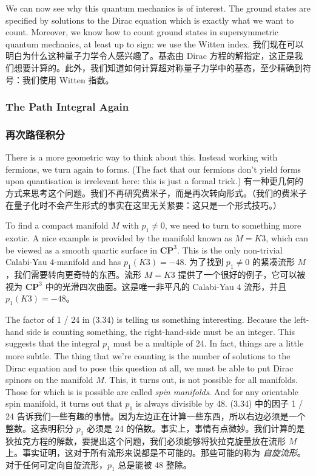 \documentclass{ctexart}
\begin{document}
\begin{paracol}{2}
We can now see why this quantum mechanics is of interest. The ground states are specified by solutions to the Dirac equation which is exactly what we want to count. Moreover, we know how to count ground states in supersymmetric quantum mechanics, at least up to sign: we use the Witten index.
\switchcolumn
我们现在可以明白为什么这种量子力学令人感兴趣了。基态由 Dirac 方程的解指定，这正是我们想要计算的。此外，我们知道如何计算超对称量子力学中的基态，至少精确到符号：我们使用 Witten 指数。
\switchcolumn*

\subsubsection{The Path Integral Again}
\switchcolumn
\subsubsection*{再次路径积分}
\switchcolumn*

There is a more geometric way to think about this. Instead working with fermions, we turn again to forms. (The fact that our fermions don't yield forms upon quantisation is irrelevant here: this is just a formal trick.)
\switchcolumn
有一种更几何的方式来思考这个问题。我们不再研究费米子，而是再次转向形式。（我们的费米子在量子化时不会产生形式的事实在这里无关紧要：这只是一个形式技巧。）
\switchcolumn*

To find a compact manifold $M$ with $p_1 \neq 0$, we need to turn to something more exotic. A nice example is provided by the manifold known as $M = K3$, which can be viewed as a smooth quartic surface in $\mathbf{CP}^3$. This is the only non-trivial Calabi-Yau $4$-manifold and has $p_1(K3) = - 48$.
\switchcolumn
为了找到 $p_1 \neq 0$ 的紧凑流形 $M$，我们需要转向更奇特的东西。流形 $M = K3$ 提供了一个很好的例子，它可以被视为 $\mathbf{CP}^3$ 中的光滑四次曲面。这是唯一非平凡的 Calabi-Yau $4$ 流形，并且 $p_1(K3) = - 48$。
\switchcolumn*

The factor of 1 / 24 in (3.34) is telling us something interesting. Because the left-hand side is counting something, the right-hand-side must be an integer. This suggests that the integral $p_1$ must be a multiple of 24. In fact, things are a little more subtle. The thing that we're counting is the number of solutions to the Dirac equation and to pose this question at all, we must be able to put Dirac spinors on the manifold $M$. This, it turns out, is not possible for all manifolds. Those for which is is possible are called \textit{spin manifolds}. And for any orientable spin manifold, it turns out that $p_1$ is always divisible by 48.
\switchcolumn
(3.34) 中的因子 1 / 24 告诉我们一些有趣的事情。因为左边正在计算一些东西，所以右边必须是一个整数。这表明积分 $p_1$ 必须是 24 的倍数。事实上，事情有点微妙。我们计算的是狄拉克方程的解数，要提出这个问题，我们必须能够将狄拉克旋量放在流形 $M$ 上。事实证明，这对于所有流形来说都是不可能的。那些可能的称为 \textit{自旋流形}。对于任何可定向自旋流形，$p_1$ 总是能被 48 整除。
\switchcolumn*


\end{paracol}
\end{document}
